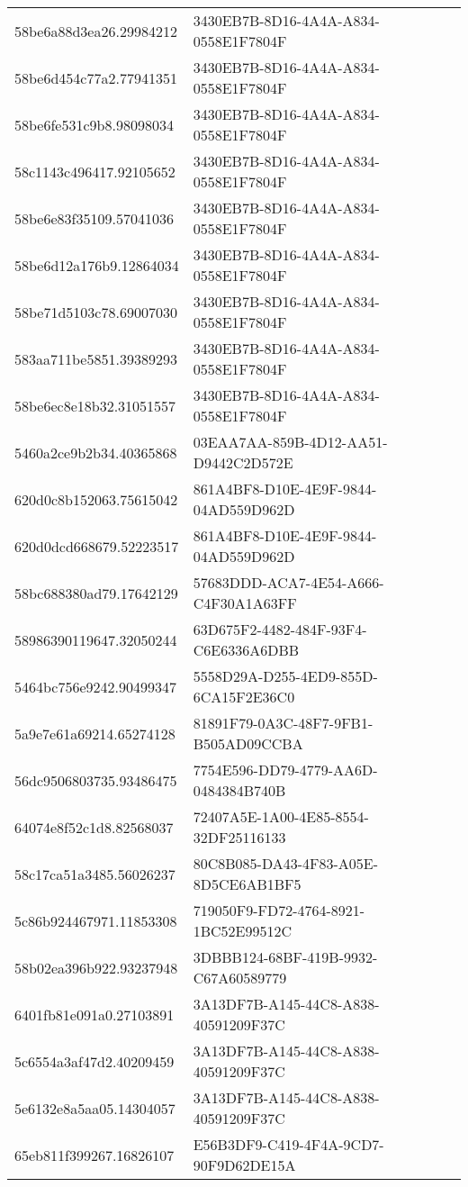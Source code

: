 \begin{tabular}{ll}
58be6a88d3ea26.29984212 & 3430EB7B-8D16-4A4A-A834-0558E1F7804F \\
58be6d454c77a2.77941351 & 3430EB7B-8D16-4A4A-A834-0558E1F7804F \\
58be6fe531c9b8.98098034 & 3430EB7B-8D16-4A4A-A834-0558E1F7804F \\
58c1143c496417.92105652 & 3430EB7B-8D16-4A4A-A834-0558E1F7804F \\
58be6e83f35109.57041036 & 3430EB7B-8D16-4A4A-A834-0558E1F7804F \\
58be6d12a176b9.12864034 & 3430EB7B-8D16-4A4A-A834-0558E1F7804F \\
58be71d5103c78.69007030 & 3430EB7B-8D16-4A4A-A834-0558E1F7804F \\
583aa711be5851.39389293 & 3430EB7B-8D16-4A4A-A834-0558E1F7804F \\
58be6ec8e18b32.31051557 & 3430EB7B-8D16-4A4A-A834-0558E1F7804F \\
5460a2ce9b2b34.40365868 & 03EAA7AA-859B-4D12-AA51-D9442C2D572E \\
620d0c8b152063.75615042 & 861A4BF8-D10E-4E9F-9844-04AD559D962D \\
620d0dcd668679.52223517 & 861A4BF8-D10E-4E9F-9844-04AD559D962D \\
58bc688380ad79.17642129 & 57683DDD-ACA7-4E54-A666-C4F30A1A63FF \\
58986390119647.32050244 & 63D675F2-4482-484F-93F4-C6E6336A6DBB \\
5464bc756e9242.90499347 & 5558D29A-D255-4ED9-855D-6CA15F2E36C0 \\
5a9e7e61a69214.65274128 & 81891F79-0A3C-48F7-9FB1-B505AD09CCBA \\
56dc9506803735.93486475 & 7754E596-DD79-4779-AA6D-0484384B740B \\
64074e8f52c1d8.82568037 & 72407A5E-1A00-4E85-8554-32DF25116133 \\
58c17ca51a3485.56026237 & 80C8B085-DA43-4F83-A05E-8D5CE6AB1BF5 \\
5c86b924467971.11853308 & 719050F9-FD72-4764-8921-1BC52E99512C \\
58b02ea396b922.93237948 & 3DBBB124-68BF-419B-9932-C67A60589779 \\
6401fb81e091a0.27103891 & 3A13DF7B-A145-44C8-A838-40591209F37C \\
5c6554a3af47d2.40209459 & 3A13DF7B-A145-44C8-A838-40591209F37C \\
5e6132e8a5aa05.14304057 & 3A13DF7B-A145-44C8-A838-40591209F37C \\
65eb811f399267.16826107 & E56B3DF9-C419-4F4A-9CD7-90F9D62DE15A \\

\end{tabular}

